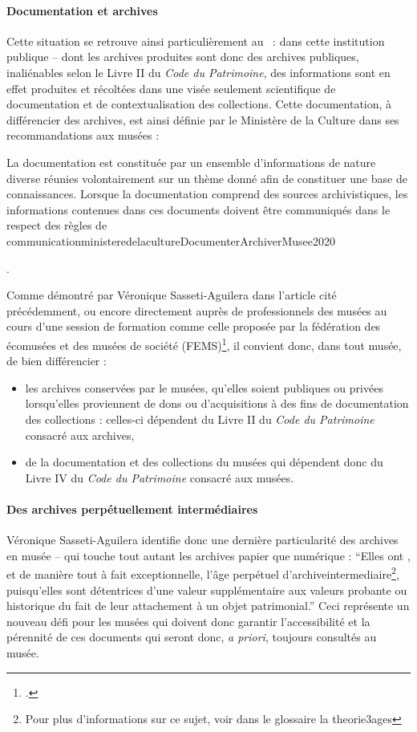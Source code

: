 \paragraph*{Documentation et archives}
Cette situation se retrouve ainsi particulièrement au \mae~: dans cette institution publique -- dont les archives produites sont donc des archives publiques, inaliénables selon le Livre II du \textit{Code du Patrimoine}, des informations sont en effet produites et récoltées dans une visée seulement scientifique de documentation et de contextualisation des collections. Cette documentation, à différencier des archives, est ainsi définie par le Ministère de la Culture dans ses recommandations aux musées : 
\begin{myquote}
	{La documentation est constituée par un ensemble d'informations de nature diverse réunies volontairement sur un thème donné afin de constituer une base de connaissances. Lorsque la documentation comprend des sources archivistiques, les informations contenues dans ces documents doivent être communiqués dans le respect des règles de communication}{ministeredelacultureDocumenterArchiverMusee2020}
\end{myquote}.

Comme démontré par Véronique Sasseti-Aguilera dans l'article cité précédemment, ou encore directement auprès de professionnels des musées au cours d'une session de formation comme celle proposée par la fédération des écomusées et des musées de société (FEMS)\footcite{federationdesecomuseesetmuseesdesocietefemsArchivesMusees2025}, il convient donc, dans tout musée, de bien différencier :
\begin{itemize}
	\item les archives conservées par le musées, qu'elles soient publiques ou privées lorsqu'elles proviennent de dons ou d'acquisitions à des fins de documentation des collections : celles-ci dépendent du Livre II du \textit{Code du Patrimoine} consacré aux archives, 
	\item de la documentation et des collections du musées qui dépendent donc du Livre IV du \textit{Code du Patrimoine} consacré aux musées.
\end{itemize}

\paragraph*{Des archives perpétuellement intermédiaires}
Véronique Sasseti-Aguilera identifie donc une dernière particularité des archives en musée -- qui touche tout autant les archives papier que numérique : \enquote{Elles ont \textelp{}, et de manière tout à fait exceptionnelle, l’âge perpétuel d’\gls{archiveintermediaire}\footnote{Pour plus d'informations sur ce sujet, voir dans le glossaire la \gls{theorie3ages}}, puisqu’elles sont détentrices d’une valeur supplémentaire aux valeurs probante ou historique du fait de leur attachement à un objet patrimonial.} Ceci représente un nouveau défi pour les musées qui doivent donc garantir l'accessibilité et la pérennité de ces documents qui seront donc, \textit{a priori}, toujours consultés au musée.

